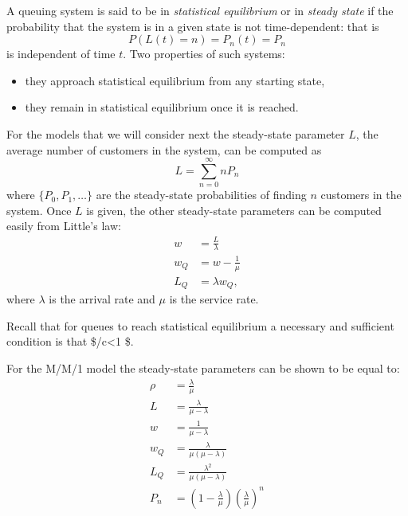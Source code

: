 \documentclass[
]{book}
\begin{document}
A queuing system is said to be in \emph{statistical equilibrium} or in \emph{steady state} if the probability that the system is in a given state is not time-dependent: that is
\[
P(L(t)=n)= P_n(t) = P_n
\]
is independent of time \(t\). Two properties of such systems:

\begin{itemize}
\item
  they approach statistical equilibrium from any starting state,
\item
  they remain in statistical equilibrium once it is reached.
\end{itemize}

For the models that we will consider next the steady-state parameter \(L\), the average number of customers in the system, can be computed as
\[
L= \sum_{n=0}^\infty nP_n
\]
where \(\{P_0,P_1,\dots\}\) are the steady-state probabilities of finding \(n\) customers in the system. Once \(L\) is given, the other steady-state parameters can be computed easily from Little's law:
\begin{align*}
w &= \frac{L}{\lambda}\\
w_Q &= w - \frac{1}{\mu}\\
L_Q &= \lambda w_Q, 
\end{align*}
where \(\lambda\) is the arrival rate and \(\mu\) is the service rate.

Recall that for queues to reach statistical equilibrium a necessary and sufficient condition is that \$\lambda/c\mu \textless1 \$.

For the M/M/1 model the steady-state parameters can be shown to be equal to:
\begin{align*}
\rho &= \frac{\lambda}{\mu} \\
L &= \frac{\lambda}{\mu-\lambda}\\
w &= \frac{1}{\mu-\lambda}\\
w_Q &= \frac{\lambda}{\mu(\mu-\lambda)}\\
L_Q &= \frac{\lambda^2}{\mu(\mu-\lambda)}\\
P_n &= \left(1-\frac{\lambda}{\mu}\right)\left(\frac{\lambda}{\mu}\right)^n
\end{align*}
\end{document}
